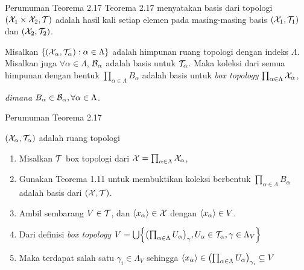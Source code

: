 \begin{frame}{Perumuman Teorema 2.17}
    Teorema 2.17 menyatakan basis dari topologi $\oio*{\nX_1\times\nX_2,\nT}$ adalah hasil kali setiap elemen 
    pada masing-masing basis $\oio*{\nX_1,\nT_1}$ dan $\oio*{\nX_2,\nT_2}$.
    \begin{tcolorbox}[enhanced,title=Teorema 2.29, frame style tile={width=\paperwidth}{\wallpaper}]
        Misalkan $\set*{\oio*{\nX_\alpha,\nT_\alpha}:\alpha \in \Lambda}$ adalah himpunan ruang topologi
        dengan indeks $\Lambda$. Misalkan juga $\forall \alpha \in \Lambda$, $\nB_\alpha$ adalah basis 
        untuk $\nT_\alpha$. Maka koleksi dari semua himpunan dengan bentuk 
        $\prod_{\alpha \in \Lambda}B_\alpha$ adalah basis untuk \textit{box topology} $\prod_{\alpha \in \Lambda}\nX_\alpha$,
        
        \textit{dimana} $B_\alpha\in\nB_\alpha, \forall \alpha \in \Lambda$.
    \end{tcolorbox}
\end{frame}

\begin{frame}{Perumuman Teorema 2.17}
    \begin{tcolorbox}[enhanced,title=Teorema 2.29  (Bukti), frame style tile={width=\paperwidth}{\wallpaper}]
        $(\nX_\alpha,\nT_\alpha)$ adalah ruang topologi
        \begin{enumerate}
            \item Misalkan $\nT$ box topologi dari $\nX = \prod_{\alpha \in \Lambda}\nX_\alpha$,
            \item Gunakan Teorema 1.11 untuk membuktikan koleksi berbentuk $\prod_{\alpha \in \Lambda}B_\alpha$ 
            adalah basis dari $(\nX,\nT)$.
            \item Ambil sembarang $V \in \nT$, dan $\seq*{x_\alpha} \in \nX$ dengan $\seq*{x_\alpha}\in V$.
            \item Dari definisi \textit{box topology} $V=\bigcup\set*{\oio*{\prod_{\alpha\in\Lambda}U_\alpha}_\gamma, U_\alpha \in \nT_\alpha, \gamma \in \Lambda_V}$
            \item Maka terdapat salah satu $\gamma_i\in\Lambda_V$ sehingga  $\seq*{x_\alpha} \in \oio*{\prod_{\alpha\in\Lambda}U_\alpha}_{\gamma_i} \subseteq V$
        \end{enumerate}
    \end{tcolorbox}
\end{frame}


